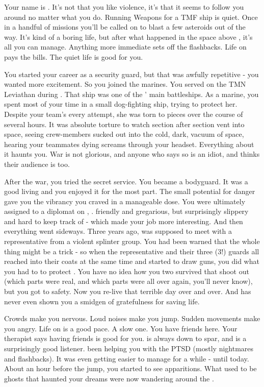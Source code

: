 \documentclass[char]{TMFHope}
\begin{document}
\name{\cWeap{}}

Your name is \cWeap{\full}.  It's not that you like violence, it's that it seems to follow you around no matter what you do. Running Weapons for a TMF ship is quiet. Once in a handful of missions you'll be called on to blast a few asteroids out of the way. It's kind of a boring life, but after what happened in the space above \pHome{}, it's all you can manage. Anything more immediate sets off the flashbacks. Life on \pNew{} pays the bills. The quiet life is good for you.

You started your career as a security guard, but that was awfully repetitive - you wanted more excitement. So you joined the marines. You served on the TMN Leviathan during \pBattle{}. That ship was one of the \pPlan{}' main battleships. As a marine, you spent most of your time in a small dog-fighting ship, trying to protect her. Despite your team's every attempt, she was torn to pieces over the course of several hours. It was absolute torture to watch section after section vent into space, seeing crew-members sucked out into the cold, dark, vacuum of space, hearing your teammates dying screams through your headset. Everything about it haunts you. War is not glorious, and anyone who says so is an idiot, and thinks their audience is too.

After the war, you tried the \pPlan{} secret service. You became a bodyguard. It was a good living and you enjoyed it for the most part. The small potential for danger gave you the vibrancy you craved in a manageable dose. You were ultimately assigned to a diplomat on \pHome{}, \cDip{\full}. \cDip{\They} \cDip{\were} friendly and gregarious, but surprisingly slippery and hard to keep track of - which made your job more interesting. And then everything went sideways. Three years ago, \cDip{} was supposed to meet with a representative from a violent splinter group. You had been warned that the whole thing might be a trick - so when the representative and their three (3!) guards all reached into their coats at the same time and started to draw guns, you did what you had to to protect \cDip{}. You have no idea how you two survived that shoot out (which parts were real, and which parts were \pBattle{} all over again, you'll never know), but you got \cDip{\them} to safety. Now you re-live that terrible day over and over. And \cDip{} has never even shown you a smidgen of gratefulness for saving \cDip{\their} life.

Crowds make you nervous. Loud noises make you jump. Sudden movements make you angry. Life on \pNew{} is a good pace. A slow one. You have friends here. Your therapist says having friends is good for you. \cSci{} is always down to spar, and \cNav{} is a surprisingly good listener. \cNav{\They} \cNav{\have} been helping you with the PTSD (mostly nightmares and flashbacks). It was even getting easier to manage for a while - until today. About an hour before the jump, you started to see apparitions. What used to be ghosts that haunted your dreams were now wandering around the \pNew{}.
\end{document}
